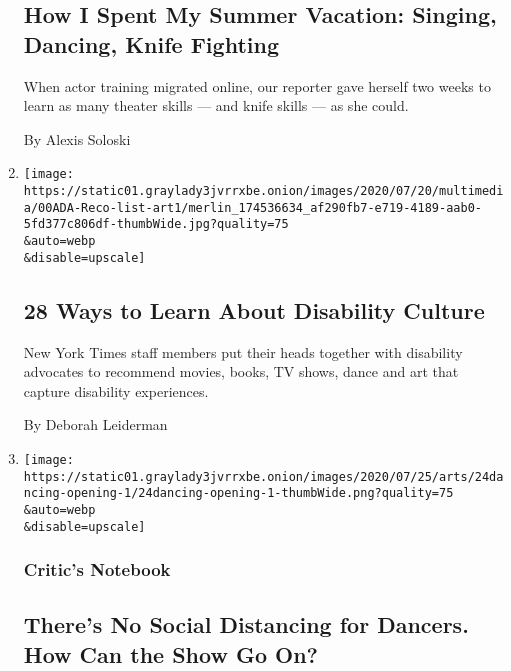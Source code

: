 \begin{enumerate}
  \hypertarget{how-i-spent-my-summer-vacation-singing-dancing-knife-fighting}{%
  \subsection{How I Spent My Summer Vacation: Singing, Dancing, Knife
  Fighting}\label{how-i-spent-my-summer-vacation-singing-dancing-knife-fighting}}

  When actor training migrated online, our reporter gave herself two
  weeks to learn as many theater skills --- and knife skills --- as she
  could.

  By Alexis Soloski
\item
  \href{/2020/07/24/arts/disability-movies-books-tv.html}{}

  \texttt{[image: https://static01.graylady3jvrrxbe.onion/images/2020/07/20/multimedia/00ADA-Reco-list-art1/merlin\_174536634\_af290fb7-e719-4189-aab0-5fd377c806df-thumbWide.jpg?quality=75\\\&auto=webp\\\&disable=upscale]}

  \hypertarget{28-ways-to-learn-about-disability-culture}{%
  \subsection{28 Ways to Learn About Disability
  Culture}\label{28-ways-to-learn-about-disability-culture}}

  New York Times staff members put their heads together with disability
  advocates to recommend movies, books, TV shows, dance and art that
  capture disability experiences.

  By Deborah Leiderman
\item
  \href{/2020/07/24/arts/dance/safety-protocols-dance-coronavirus.html}{}

  \texttt{[image: https://static01.graylady3jvrrxbe.onion/images/2020/07/25/arts/24dancing-opening-1/24dancing-opening-1-thumbWide.png?quality=75\\\&auto=webp\\\&disable=upscale]}

  \hypertarget{critics-notebook}{%
  \subsubsection{Critic's Notebook}\label{critics-notebook}}

  \hypertarget{theres-no-social-distancing-for-dancers-how-can-the-show-go-on}{%
  \subsection{There's No Social Distancing for Dancers. How Can the Show
  Go
  On?}\label{theres-no-social-distancing-for-dancers-how-can-the-show-go-on}}


\end{enumerate}
